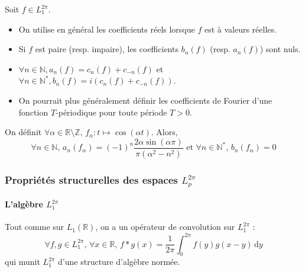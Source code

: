  \begin{remark}
    Soit $f \in L_1^{2\pi}$.
    \begin{itemize}
      \item On utilise en général les coefficients réels lorsque $f$ est à valeurs réelles.
      \item Si $f$ est paire (resp. impaire), les coefficients $b_n(f)$ (resp. $a_n(f)$) sont nuls.
      \item $\forall n \in \mathbb{N}, a_n(f) = c_n(f) + c_{-n}(f)$ et $\forall n \in \mathbb{N}^*, b_n(f) = i(c_n(f) + c_{-n}(f))$.
      \item On pourrait plus généralement définir les coefficients de Fourier d'une fonction $T$-périodique pour toute période $T > 0$.
    \end{itemize}
  \end{remark}


  \begin{example}
    On définit $\forall \alpha \in \mathbb{R} \setminus \mathbb{Z}, \, f_\alpha : t \mapsto \cos(\alpha t)$. Alors,
    \[ \forall n \in \mathbb{N}, \, a_n(f_\alpha) = (-1)^n \frac{2 \alpha \sin(\alpha \pi)}{\pi (\alpha^2 - n^2)} \text{ et } \forall n \in \mathbb{N}^*, \, b_n(f_\alpha) = 0 \]
  \end{example}

  \subsubsection{Propriétés structurelles des espaces \texorpdfstring{$L_p^{2 \pi}$}{Lₚ²ᵖⁱ}}

  \paragraph{L'algèbre \texorpdfstring{$L_1^{2 \pi}$}{L₁²ᵖⁱ}}


  \begin{proposition}
    Tout comme sur $L_1(\mathbb{R})$, on a un opérateur de convolution sur $L_1^{2 \pi}$ :
    \[ \forall f, g \in L_1^{2 \pi}, \, \forall x \in \mathbb{R}, \, f*g(x) = \frac{1}{2 \pi} \int_0^{2\pi} f(y) g(x - y) \, \mathrm{d}y \]
    qui munit $L_1^{2 \pi}$ d'une structure d'algèbre normée.
  \end{proposition}


